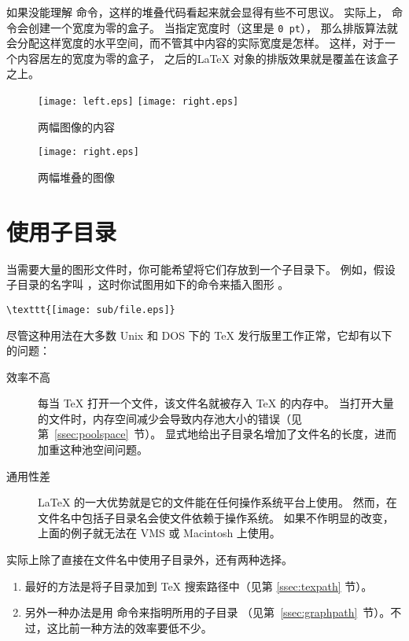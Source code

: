 如果没能理解  命令，这样的堆叠代码看起来就会显得有些不可思议。
实际上， 命令会创建一个宽度为零的盒子。
当指定宽度时（这里是 \texttt{0 pt}），
那么排版算法就会分配这样宽度的水平空间，而不管其中内容的实际宽度是怎样。
这样，对于一个内容居左的宽度为零的盒子，
之后的\LaTeX{} 对象的排版效果就是覆盖在该盒子之上。

\begin{figure}
	\centering
	\texttt{[image: left.eps]}
	\texttt{[image: right.eps]}
	\caption{两幅图像的内容}\label{fig:leftright}
\end{figure}
\begin{figure}
	\centering
	\texttt{[image: right.eps]}
	\caption{两幅堆叠的图像}\label{fig:leftrightoverlay}
\end{figure}

\section{使用子目录}\label{sec:subdir}

当需要大量的图形文件时，你可能希望将它们存放到一个子目录下。
例如，假设子目录的名字叫 ，这时你试图用如下的命令来插入图形 。
\begin{lstlisting}
\texttt{[image: sub/file.eps]}
\end{lstlisting}

尽管这种用法在大多数 Unix 和 DOS 下的 \TeX{} 发行版里工作正常，它却有以下的问题：
\begin{description}
	\item [效率不高]
	
	每当 \TeX{} 打开一个文件，该文件名就被存入 TeX{} 的内存中。
	当打开大量的文件时，内存空间减少会导致内存池大小的错误（见第~\ref{ssec:poolspace}~节）。
	显式地给出子目录名增加了文件名的长度，进而加重这种池空间问题。
	
	\item [通用性差]
	
	\LaTeX{} 的一大优势就是它的文件能在任何操作系统平台上使用。
	然而，在文件名中包括子目录名会使文件依赖于操作系统。
	如果不作明显的改变，上面的例子就无法在 VMS 或 Macintosh 上使用。
\end{description}
实际上除了直接在文件名中使用子目录外，还有两种选择。
\begin{enumerate}
	\item 最好的方法是将子目录加到 \TeX{} 搜索路径中（见第 \ref{ssec:texpath} 节）。
	\item 另外一种办法是用  命令来指明所用的子目录
	（见第~\ref{ssec:graphpath}~节）。不过，这比前一种方法的效率要低不少。
\end{enumerate}

